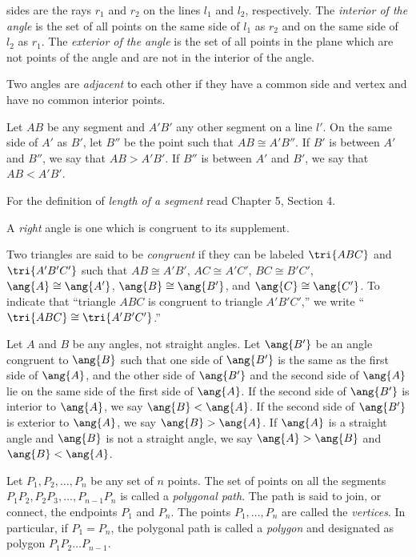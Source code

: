 \documentclass[11pt]{book}
\theoremstyle{bkplain}
\theoremstyle{XIplainnote}
\theoremstyle{bkplain}
\theoremstyle{bkplain}
\begin{document}
\begin{applist}
      sides are the rays $r_1$ and $r_2$ on the lines $l_1$ and $l_2$,
      respectively. The \emph{interior of the angle} is the set of all
      points on the same side of $l_1$ as $r_2$ and on the same side of
      $l_2$ as $r_1$. The \emph{exterior of the angle} is the set of all
      points in the plane which are not points of the angle and are not in
      the interior of the angle.
\item Two angles are \emph{adjacent} to each other if they have a common
      side and vertex and have no common interior points.
\item Let $AB$ be any segment and $A'B'$ any other segment on a line $l'$.
      On the same side of $A'$ as $B'$, let $B''$ be the point such that
      $AB \cong A'B''$. If $B'$ is between $A'$ and $B''$, we say that
      $AB > A'B'$. If $B''$ is between $A'$ and $B'$, we say that
      $AB < A'B'$.
\item For the definition of \emph{length of a segment} read Chapter 5,
      Section 4.
\item A \emph{right} angle is one which is congruent to its supplement.
\item Two triangles are said to be \emph{congruent} if they can be labeled
      $\tri{ABC}$ and $\tri{A'B'C'}$ such that $AB \cong A'B'$,
      $AC \cong A'C'$, $BC \cong B'C'$, $\ang{A} \cong \ang{A'}$,
      $\ang{B} \cong \ang{B'}$, and $\ang{C} \cong \ang{C'}$. To indicate
      that ``triangle $ABC$ is congruent to triangle $A'B'C'$,'' we write
      ``$\tri{ABC} \cong \tri{A'B'C'}$.''
\item Let $A$ and $B$ be any angles, not straight angles. Let $\ang{B'}$ be
      an angle congruent to $\ang{B}$ such that one side of $\ang{B'}$ is
      the same as the first side of $\ang{A}$, and the other side of
      $\ang{B'}$ and the second side of $\ang{A}$ lie on the same side of
      the first side of $\ang{A}$. If the second side of $\ang{B'}$ is
      interior to $\ang{A}$, we say $\ang{B} < \ang{A}$. If the second side
      of $\ang{B'}$ is exterior to $\ang{A}$, we say $\ang{B} > \ang{A}$. If
      $\ang{A}$ is a straight angle and $\ang{B}$ is not a straight angle,
      we say $\ang{A} > \ang{B}$ and $\ang{B} < \ang{A}$.
\item Let $P_1, P_2, \ldots, P_n$ be any set of $n$ points. The set of
      points on all the segments $P_1P_2, P_2P_3, \ldots, P_{n-1}P_n$ is
      called a \emph{polygonal path}. The path is said to join, or connect,
      the endpoints $P_1$ and $P_n$. The points $P_1, \ldots, P_n$ are
      called the \emph{vertices}. In particular, if $P_1 = P_n$, the
      polygonal path is called a \emph{polygon} and designated as polygon
      $P_1P_2 \ldots P_{n-1}$.


\end{applist}
\end{document}
